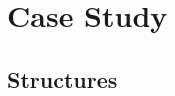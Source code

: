 \documentclass{article}
\begin{document}

\section{Case Study}

\subsection{Structures}

\begin{figure}[htbp]
    \centering
    \begin{subfigure}[b]{0.2\textwidth}

\end{subfigure}
\end{figure}
\end{document}
